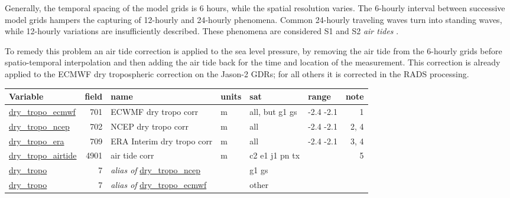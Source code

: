 \documentclass[a4paper,11pt,openany,natbib]{thesis}
\makeatletter
\newcommand\var[1]{\url{#1}\index{variables!#1@\protect\url{#1}}}
\newcommand\alias[1]{\emph{alias of} \var{#1}}
\newenvironment{vartable}{
\begin{table}[ht]
\small
\begin{tabular}{lrllllr}
\hline
Variable & field & name & units & sat & range & note \\
\hline
}{
\hline
\end{tabular}
\end{table}
}
\makeatother
\begin{document}
Generally, the temporal spacing of the model grids is 6 hours, while the spatial resolution varies. The 6-hourly interval between successive model grids hampers the capturing of 12-hourly and 24-hourly phenomena. Common 24-hourly traveling waves turn into standing waves, while 12-hourly variations are insufficiently described. These phenomena are considered S1 and S2 \emph{air tides} \citep{ponte2002}.

To remedy this problem an air tide correction is applied to the sea level pressure, by removing the air tide from the 6-hourly grids before spatio-temporal interpolation and then adding the air tide back for the time and location of the measurement. This correction is already applied to the ECMWF dry tropospheric correction on the Jason-2 GDRs; for all others it is corrected in the RADS processing.

\begin{vartable}
\var{dry_tropo_ecmwf} & 701 & ECWMF dry tropo corr & m & all, but g1 gs & -2.4 -2.1 & 1 \\
\var{dry_tropo_ncep}  & 702 & NCEP dry tropo corr  & m & all & -2.4 -2.1 & 2, 4 \\
\var{dry_tropo_era}   & 709 & ERA Interim dry tropo corr   & m & all & -2.4 -2.1 & 3, 4 \\
\var{dry_tropo_airtide} & 4901 & air tide corr     & m & c2 e1 j1 pn tx & & 5 \\
\hline
\var{dry_tropo}       &   7 & \alias{dry_tropo_ncep} && g1 gs && \\
\var{dry_tropo}       &   7 & \alias{dry_tropo_ecmwf} && other && \\
\end{vartable}
\end{document}
